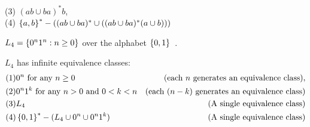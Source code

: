 \begin{problem}
\begin{enumalph}
\begin{enumroman}
\begin{Answer}
            (3) $(ab \cup ba)^*b$,\\
            (4) $\left\{a, b\right\}^* - ((ab \cup ba)^* \cup ((ab \cup ba)^*(a \cup b)))$
          \end{Answer}
        \newpage
        \item $L_4 = \left\{0^n1^n : n \geq 0\right\}$ over the alphabet $\left\{0, 1\right\}$~\label{problem:4b4}.
          \begin{Answer}
            $L_4$ has infinite equivalence classes:
            \begin{align*}
              &(1) 0^n \text{ for any $n \geq 0$} &\text{(each $n$ generates an equivalence class)},\\
              &(2) 0^n 1^k \text{ for any $n > 0$ and $0 < k < n$} &\text{(each $(n - k)$ generates an equivalence class)}\\
              &(3) L_4 &\text{(A single equivalence class)}\\
              &(4) \left\{0, 1\right\}^* - (L_4 \cup 0^n \cup 0^n 1^k) &\text{(A single equivalence class)}
            \end{align*}
          \end{Answer}
      \end{enumroman}
  \end{enumalph}
\end{problem}
